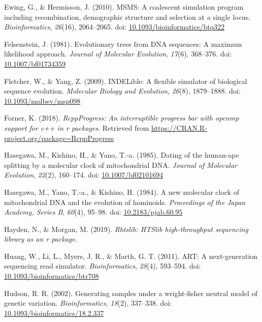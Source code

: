 \documentclass[12pt,]{article}
\begin{document}
\leavevmode\hypertarget{ref-Ewing_2010}{}%
Ewing, G., \& Hermisson, J. (2010). MSMS: A coalescent simulation program including recombination, demographic structure and selection at a single locus. \emph{Bioinformatics}, \emph{26}(16), 2064--2065. doi: \href{https://doi.org/10.1093/bioinformatics/btq322}{10.1093/bioinformatics/btq322}

\leavevmode\hypertarget{ref-Felsenstein_1981}{}%
Felsenstein, J. (1981). Evolutionary trees from DNA sequences: A maximum likelihood approach. \emph{Journal of Molecular Evolution}, \emph{17}(6), 368--376. doi: \href{https://doi.org/10.1007/bf01734359}{10.1007/bf01734359}

\leavevmode\hypertarget{ref-Fletcher_2009}{}%
Fletcher, W., \& Yang, Z. (2009). INDELible: A flexible simulator of biological sequence evolution. \emph{Molecular Biology and Evolution}, \emph{26}(8), 1879--1888. doi: \href{https://doi.org/10.1093/molbev/msp098}{10.1093/molbev/msp098}

\leavevmode\hypertarget{ref-Forner_2018}{}%
Forner, K. (2018). \emph{RcppProgress: An interruptible progress bar with openmp support for c++ in r packages}. Retrieved from \url{https://CRAN.R-project.org/package=RcppProgress}

\leavevmode\hypertarget{ref-Hasegawa_1985}{}%
Hasegawa, M., Kishino, H., \& Yano, T.-a. (1985). Dating of the human-ape splitting by a molecular clock of mitochondrial DNA. \emph{Journal of Molecular Evolution}, \emph{22}(2), 160--174. doi: \href{https://doi.org/10.1007/bf02101694}{10.1007/bf02101694}

\leavevmode\hypertarget{ref-Hasegawa_1984}{}%
Hasegawa, M., Yano, T.-a., \& Kishino, H. (1984). A new molecular clock of mitochondrial DNA and the evolution of hominoids. \emph{Proceedings of the Japan Academy, Series B}, \emph{60}(4), 95--98. doi: \href{https://doi.org/10.2183/pjab.60.95}{10.2183/pjab.60.95}

\leavevmode\hypertarget{ref-Hayden_2019}{}%
Hayden, N., \& Morgan, M. (2019). \emph{Rhtslib: HTSlib high-throughput sequencing library as an r package}.

\leavevmode\hypertarget{ref-Huang_2011}{}%
Huang, W., Li, L., Myers, J. R., \& Marth, G. T. (2011). ART: A next-generation sequencing read simulator. \emph{Bioinformatics}, \emph{28}(4), 593--594. doi: \href{https://doi.org/10.1093/bioinformatics/btr708}{10.1093/bioinformatics/btr708}

\leavevmode\hypertarget{ref-Hudson_2002}{}%
Hudson, R. R. (2002). Generating samples under a wright-fisher neutral model of genetic variation. \emph{Bioinformatics}, \emph{18}(2), 337--338. doi: \href{https://doi.org/10.1093/bioinformatics/18.2.337}{10.1093/bioinformatics/18.2.337}
\end{document}
